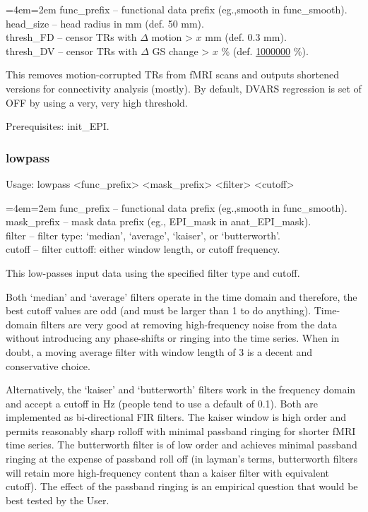 \documentclass[final,titlepage,letterpaper,oneside,12pt]{article}
\renewcommand{\texttt}[2][BrickRed]{\textcolor{#1}{\ttfamily #2}}%
\newenvironment{blockquote}{%
  \par%
  \medskip
  \leftskip=4em\rightskip=2em%
  \noindent\ignorespaces}{%
  \par\medskip}
\begin{document}
\begin{blockquote}
func\_prefix -- functional data prefix (eg.,smooth in func\_smooth). \\
head\_size -- head radius in mm (def. 50 mm). \\
thresh\_FD -- censor TRs with $\Delta$ motion > $x$ mm (def. 0.3 mm). \\
thresh\_DV -- censor TRs with $\Delta$ GS change > $x$ \% (def. \href{http://upload.wikimedia.org/wikipedia/en/1/16/Drevil_million_dollars.jpg}{1000000} \%). \
\end{blockquote}

\noindent This removes motion-corrupted TRs from fMRI scans and outputs shortened versions for connectivity analysis (mostly). By default, DVARS regression is set of OFF by using a very, very high threshold.

Prerequisites: \texttt{init\_EPI}.

\subsubsection{lowpass}
Usage: \texttt{lowpass <func\_prefix> <mask\_prefix> <filter> <cutoff>}

\begin{blockquote}
func\_prefix -- functional data prefix (eg.,smooth in func\_smooth). \\
mask\_prefix -- mask data prefix (eg., EPI\_mask in anat\_EPI\_mask). \\
filter -- filter type: `median', `average', `kaiser', or `butterworth'. \\
cutoff -- filter cuttoff: either window length, or cutoff frequency. \
\end{blockquote}

\noindent This low-passes input data using the specified filter type and cutoff. 

Both `median' and `average' filters operate in the time domain and therefore, the best cutoff values are odd (and must be larger than 1 to do anything). Time-domain filters are very good at removing high-frequency noise from the data without introducing any phase-shifts or ringing into the time series. When in doubt, a moving average filter with window length of 3 is a decent and conservative choice.

Alternatively, the `kaiser' and `butterworth' filters work in the frequency domain and accept a cutoff in Hz (people tend to use a default of 0.1). Both are implemented as bi-directional FIR filters. The kaiser window is high order and permits reasonably sharp rolloff with minimal passband ringing for shorter fMRI time series. The butterworth filter is of low order and achieves minimal passband ringing at the expense of passband roll off (in layman's terms, butterworth filters will retain more high-frequency content than a kaiser filter with equivalent cutoff). The effect of the passband ringing is an empirical question that would be best tested by the User.
\end{document}
